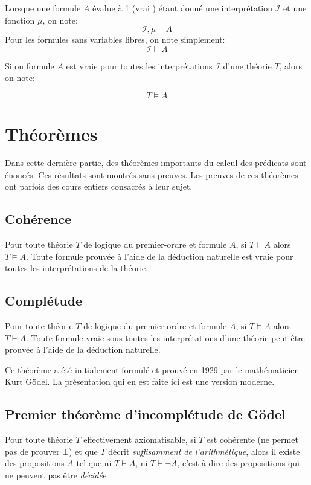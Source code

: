 Lorsque une formule $A$ évalue à 1 (\og vrai \fg{}) étant donné une interprétation $\mathcal{I}$ et une fonction $\mu$, on note:
\[
\mathcal{I}, \mu \vDash A
\]
Pour les formules sans variables libres, on note simplement:
\[
\mathcal{I} \vDash A
\]

Si on formule $A$ est vraie pour toutes les interprétations $\mathcal{I}$ d'une théorie $T$, alors on note:

\[
T \vDash A
\]

\section{Théorèmes}

Dans cette dernière partie, des théorèmes importants du calcul des prédicats sont énoncés.
Ces résultats sont montrés sans preuves.
Les preuves de ces théorèmes ont parfois des cours entiers consacrés à leur sujet.

\subsection{Cohérence}

Pour toute théorie $T$ de logique du premier-ordre et formule $A$, si $T \vdash A$ alors $T \vDash A$.
Toute formule prouvée à l'aide de la déduction naturelle est vraie pour toutes les interprétations de la théorie.

\subsection{Complétude}

Pour toute théorie $T$ de logique du premier-ordre et formule $A$, si $T \vDash A$ alors $T \vdash A$.
Toute formule vraie sous toutes les interprétations d'une théorie peut être prouvée à l'aide de la déduction naturelle.

Ce théorème a été initialement formulé et prouvé en 1929 par le mathématicien Kurt Gödel.
La présentation qui en est faite ici est une version moderne.

\subsection{Premier théorème d'incomplétude de Gödel}

Pour toute théorie $T$ effectivement axiomatisable, si $T$ est cohérente (ne permet pas de prouver $\bot$) et que $T$ décrit \textit{suffisamment de l'arithmétique}, alors il existe des propositions $A$ tel que ni $T \vdash A$, ni $T \vdash \neg A$, c'est à dire des propositions qui ne peuvent pas être \textit{décidée}.

